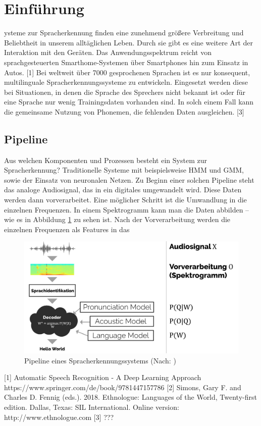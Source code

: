 \section{Einführung}\label{sec:introduction}
ysteme zur Spracherkennung finden eine zunehmend größere Verbreitung und Beliebtheit in unserem alltäglichen Leben.
Durch sie gibt es eine weitere Art der Interaktion mit den Geräten.
Das Anwendungsspektrum reicht von sprachgesteuerten Smarthome-Systemen über Smartphones hin zum Einsatz in Autos. [1]
Bei weltweit über 7000 gesprochenen Sprachen ist es nur konsequent, multilinguale Spracherkennungssysteme zu entwickeln.
Eingesetzt werden diese bei Situationen, in denen die Sprache des Sprechers nicht bekannt ist oder für eine Sprache nur wenig
Trainingsdaten vorhanden sind. In solch einem Fall kann die gemeinsame Nutzung von Phonemen, die fehlenden Daten ausgleichen. [3]

\subsection{Pipeline}
Aus welchen Komponenten und Prozessen besteht ein System zur Spracherkennung?
Traditionelle Systeme mit beispielsweise HMM und GMM, sowie der Einsatz von neuronalen Netzen.
Zu Beginn einer solchen Pipeline steht das analoge Audiosignal, das in ein digitales umgewandelt wird.
Diese Daten werden dann vorverarbeitet. Eine möglicher Schritt ist die Umwandlung in die einzelnen Frequenzen.
In einem Spektrogramm kann man die Daten abbilden – wie es in Abbildung \ref{fig:pipeline} zu sehen ist.
Nach der Vorverarbeitung werden die einzelnen Frequenzen als Features in das

\begin{figure}[h!]
    \centering
    \includegraphics[width=1\linewidth]{images/Presentation-01-01}
    \caption{Pipeline eines Spracherkennungssystems (Nach: ) }%
    \label{fig:pipeline}
\end{figure}

[1] Automatic Speech Recognition - A Deep Learning Approach https://www.springer.com/de/book/9781447157786
[2] Simons, Gary F. and Charles D. Fennig (eds.). 2018. Ethnologue: Languages of the World, Twenty-first edition. Dallas, Texas: SIL International. Online version: http://www.ethnologue.com
[3] ???
